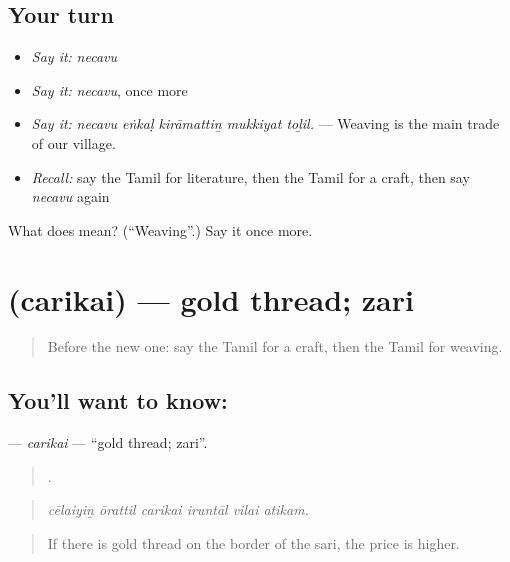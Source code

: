 \subsection*{Your turn}
\begin{itemize}
\raggedright
  \item \emph{Say it:} \emph{necavu}
  \item \emph{Say it:} \emph{necavu}, once more
  \item \emph{Say it:} \emph{necavu eṅkaḷ kirāmattiṉ mukkiyat toḻil.} — Weaving is the main trade of our village.
  \item \emph{Recall:} say the Tamil for literature, then the Tamil for a craft, then say \emph{necavu} again
\end{itemize}

\begin{tcolorbox}[breakable,colback=teal!4,colframe=teal!35!black,title={Before you move on}]
What does  mean? (\textquotedblleft{}Weaving\textquotedblright{}.) Say it once more.
\end{tcolorbox}
\section[\texorpdfstring{\ta{சரிகை} (carikai)}{சரிகை (carikai)}]{ (carikai) — gold thread; zari}

\label{lesson:TA-C556-carikai}



\begin{quote}
Before the new one: say the Tamil for a craft, then the Tamil for weaving.
\end{quote}

\subsection*{You'll want to know: }
\textbf{} — \emph{carikai} — \textquotedblleft{}gold thread; zari\textquotedblright{}.

\begin{quote}
     .
\end{quote}

\begin{quote}
\emph{cēlaiyiṉ ōrattil carikai iruntāl vilai atikam.}
\end{quote}

\begin{quote}
If there is gold thread on the border of the sari, the price is higher.
\end{quote}

